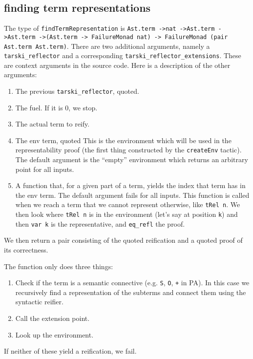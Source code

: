 \documentclass[11pt,a4paper]{article}
\begin{document}
\subsection{finding term representations}
The type of \lstinline|findTermRepresentation| is \lstinline|Ast.term ->nat ->Ast.term ->Ast.term ->(Ast.term -> FailureMonad nat) -> FailureMonad (pair Ast.term Ast.term)|. There are two additional arguments, namely a \lstinline|tarski_reflector| and a corresponding
\lstinline|tarski_reflector_extensions|. These are context arguments in the source code. Here is a description of the other arguments:
\begin{enumerate}
\item The previous \lstinline|tarski_reflector|, quoted.
\item The fuel. If it is 0, we stop.
\item The actual term to reify.
\item The env term, quoted This is the environment which will be used in the representability proof (the first thing constructed by the \lstinline|createEnv| tactic). The default argument is the \enquote{empty} environment which returns an arbitrary point for all inputs.
\item A function that, for a given part of a term, yields the index that term has in the env term. The default argument fails for all inputs. This function is called when we reach a term that we cannot represent otherwise, like \lstinline|tRel n|. We then look where \lstinline|tRel n| is in the environment (let's say at position \lstinline|k|) and then \lstinline|var k| is the representative, and \lstinline|eq_refl| the proof.
\end{enumerate}
We then return a pair consisting of the quoted reification and a quoted proof of its correctness.

The function only does three things:
\begin{enumerate}
\item Check if the term is a semantic connective (e.g. \lstinline|S|, \lstinline|O|, \lstinline|+| in PA). In this case we recursively find a representation of the subterms and connect them using the syntactic reifier.
\item Call the extension point.
\item Look up the environment.
\end{enumerate}
If neither of these yield a reification, we fail.
\end{document}
